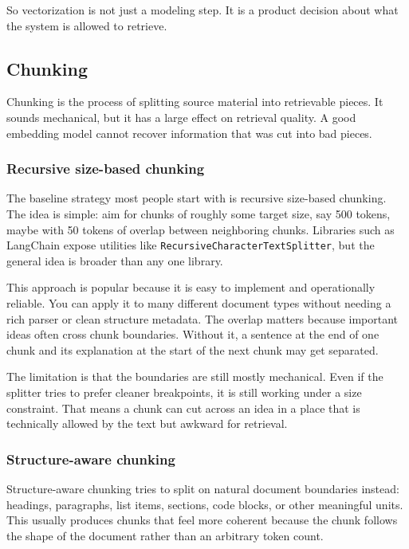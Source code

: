 \documentclass[12pt]{article}
\begin{document}
So vectorization is not just a modeling step. It is a product decision
about what the system is allowed to retrieve.

\subsection{Chunking}

Chunking is the process of splitting source material into retrievable
pieces. It sounds mechanical, but it has a large effect on retrieval
quality. A good embedding model cannot recover information that was cut
into bad pieces.

\subsubsection{Recursive size-based chunking}

The baseline strategy most people start with is recursive size-based
chunking. The idea is simple: aim for chunks of roughly some target size,
say 500 tokens, maybe with 50 tokens of overlap between neighboring
chunks. Libraries such as LangChain expose utilities like
\texttt{RecursiveCharacterTextSplitter}, but the general idea is broader
than any one library.

This approach is popular because it is easy to implement and operationally
reliable. You can apply it to many different document types without
needing a rich parser or clean structure metadata. The overlap matters
because important ideas often cross chunk boundaries. Without it, a
sentence at the end of one chunk and its explanation at the start of the
next chunk may get separated.

The limitation is that the boundaries are still mostly mechanical. Even if
the splitter tries to prefer cleaner breakpoints, it is still working
under a size constraint. That means a chunk can cut across an idea in a
place that is technically allowed by the text but awkward for retrieval.

\subsubsection{Structure-aware chunking}

Structure-aware chunking tries to split on natural document boundaries
instead: headings, paragraphs, list items, sections, code blocks, or
other meaningful units. This usually produces chunks that feel more
coherent because the chunk follows the shape of the document rather than
an arbitrary token count.
\end{document}
